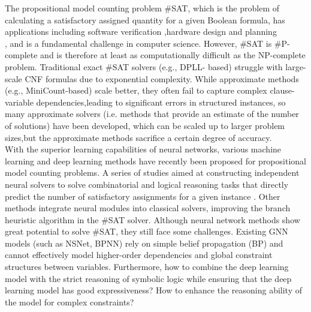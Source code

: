The propositional model counting problem \#SAT, which is the problem of calculating a satisfactory 
assigned quantity for a given Boolean formula, has applications including software verification
\cite{A1}\cite{A2},hardware design and planning\cite{B1}\cite{B2}\\ \cite{A3}, and is a fundamental 
challenge in computer science. However, \#SAT is \#P-complete and is therefore at least as 
computationally difficult as the NP-complete problem. Traditional exact \#SAT solvers (e.g., DPLL-
based)\cite{A4}\cite{A5} struggle with large-scale CNF formulas due to exponential complexity. 
While approximate methods (e.g., MiniCount-based)\cite{A6} scale better, they often fail to capture 
complex clause-variable dependencies,leading to significant errors in structured instances, so many 
approximate solvers (i.e. methods that provide an estimate of the number of solutions) have been 
developed, which can be scaled up to larger problem sizes,but the approximate methods sacrifice a 
certain degree of accuracy.\\

With the superior learning capabilities of neural networks, various machine learning and deep learning 
methods have recently been proposed for propositional model counting problems\cite{A7}\cite{B3}\cite{B4}. 
A series of studies aimed at constructing independent neural solvers to solve combinatorial and logical 
reasoning tasks that directly predict the number of satisfactory assignments for a given instance
\cite{A8}\cite{A9}. Other methods integrate neural modules into classical solvers, improving the branch 
heuristic algorithm in the \#SAT solver\cite{A10}. Although neural network methods show great potential 
to solve \#SAT, they still face some challenges. Existing GNN models (such as NSNet\cite{A11}, BPNN\cite{A12}) 
rely on simple belief propagation (BP) and cannot effectively model higher-order dependencies and global 
constraint structures between variables. Furthermore, how to combine the deep learning model with the 
strict reasoning of symbolic logic while ensuring that the deep learning model has good expressiveness?
\cite{A12} How to enhance the reasoning ability of the model for complex constraints?\cite{A14}\\

